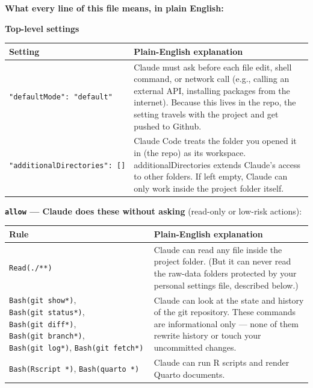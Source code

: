 \documentclass[
]{book}
\newcounter{none} %
\begin{document}
\textbf{What every line of this file means, in plain English:}

\textbf{Top-level settings}

{\def\LTcaptype{none} %
\begin{longtable}[]{@{}
  >{\raggedright\arraybackslash}p{}
  >{\raggedright\arraybackslash}p{}@{}}
\toprule\noalign{}
\begin{minipage}[b]{\linewidth}\raggedright
Setting
\end{minipage} & \begin{minipage}[b]{\linewidth}\raggedright
Plain-English explanation
\end{minipage} \\
\midrule\noalign{}
\endhead
\bottomrule\noalign{}
\endlastfoot
\texttt{"defaultMode":\ "default"} & Claude must ask before each file edit, shell command, or network call (e.g., calling an external API, installing packages from the internet). Because this lives in the repo, the setting travels with the project and get pushed to Github. \\
\texttt{"additionalDirectories":\ {[}{]}} & Claude Code treats the folder you opened it in (the repo) as its workspace. additionalDirectories extends Claude's access to other folders. If left empty, Claude can only work inside the project folder itself. \\
\end{longtable}
}

\textbf{\texttt{allow} --- Claude does these without asking} (read-only or low-risk actions):

{\def\LTcaptype{none} %
\begin{longtable}[]{@{}
  >{\raggedright\arraybackslash}p{}
  >{\raggedright\arraybackslash}p{}@{}}
\toprule\noalign{}
\begin{minipage}[b]{\linewidth}\raggedright
Rule
\end{minipage} & \begin{minipage}[b]{\linewidth}\raggedright
Plain-English explanation
\end{minipage} \\
\midrule\noalign{}
\endhead
\bottomrule\noalign{}
\endlastfoot
\texttt{Read(./**)} & Claude can read any file inside the project folder. (But it can never read the raw-data folders protected by your personal settings file, described below.) \\
\texttt{Bash(git\ show*)}, \texttt{Bash(git\ status*)}, \texttt{Bash(git\ diff*)}, \texttt{Bash(git\ branch*)}, \texttt{Bash(git\ log*)}, \texttt{Bash(git\ fetch*)} & Claude can look at the state and history of the git repository. These commands are informational only --- none of them rewrite history or touch your uncommitted changes. \\
\texttt{Bash(Rscript\ *)}, \texttt{Bash(quarto\ *)} & Claude can run R scripts and render Quarto documents. \\
\end{longtable}
}
\end{document}
